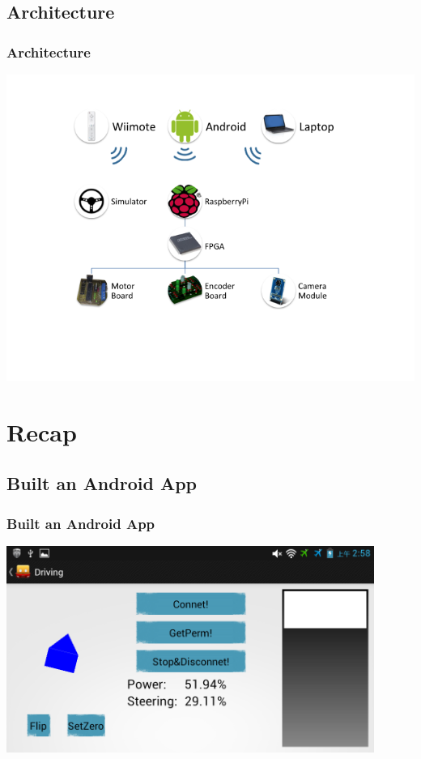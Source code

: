 \documentclass[pdf]{beamer}
\begin{document}
\subsection{Architecture}
\begin{frame}
\frametitle{Architecture}
  \begin{center}
  \includegraphics[width = \textwidth]{pics/architecture.png}
  \end{center}
\end{frame}

\section{Recap}
\subsection{Built an Android App}
\begin{frame}
\frametitle{Built an Android App}
  \begin{center}
  \includegraphics[width = 0.9\textwidth]{pics/android_controlling.png}
  \end{center}
\end{frame}
\end{document}
